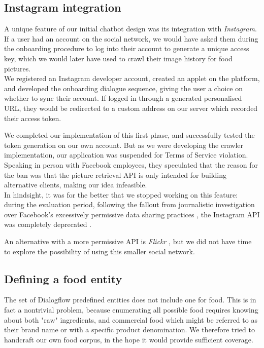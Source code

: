 \subsection{Instagram integration}
A unique feature of our initial chatbot design was its integration with \textit{Instagram}. If a user had an account on the social network, we would have asked them during the onboarding procedure to log into their account to generate a unique access key, which we would later have used to crawl their image history for food pictures.\\
We registered an Instagram developer account, created an applet on the platform, and developed the onboarding dialogue sequence, giving the user a choice on whether to sync their account. If logged in through a generated personalised URL, they would be redirected to a custom address on our server which recorded their access token.

We completed our implementation of this first phase, and successfully tested the token generation on our own account. But as we were developing the crawler implementation, our application was suspended for Terms of Service violation. Speaking in person with Facebook employees, they speculated that the reason for the ban was that the picture retrieval API is only intended for building alternative clients, making our idea infeasible. \\
In hindsight, it was for the better that we stopped working on this feature: during the evaluation period, following the fallout from journalistic investigation over Facebook's excessively permissive data sharing practices \cite{cambridgeanalytica}, the Instagram API was completely deprecated \cite{instagramdeprecated}.

An alternative with a more permissive API is \textit{Flickr} \cite{flickr}, but we did not have time to explore the possibility of using this smaller social network.
\subsection{Defining a food entity}
The set of Dialogflow predefined entities does not include one for food. This is in fact a nontrivial problem, because enumerating all possible food requires knowing about both "raw" ingredients, and commercial food which might be referred to as their brand name or with a specific product denomination. We therefore tried to handcraft our own food corpus, in the hope it would provide sufficient coverage.

